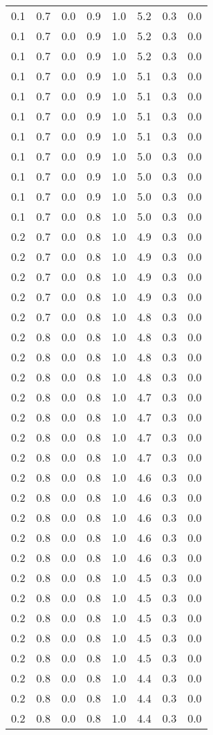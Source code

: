 \begin{tabular}{L{1in}|L{1in}|L{1in}|L{1in}|L{1in}|L{1in}|L{1in}|L{1in}}
0.1&0.7&0.0&0.9&1.0&5.2&0.3&0.0\\
0.1&0.7&0.0&0.9&1.0&5.2&0.3&0.0\\
0.1&0.7&0.0&0.9&1.0&5.2&0.3&0.0\\
0.1&0.7&0.0&0.9&1.0&5.1&0.3&0.0\\
0.1&0.7&0.0&0.9&1.0&5.1&0.3&0.0\\
0.1&0.7&0.0&0.9&1.0&5.1&0.3&0.0\\
0.1&0.7&0.0&0.9&1.0&5.1&0.3&0.0\\
0.1&0.7&0.0&0.9&1.0&5.0&0.3&0.0\\
0.1&0.7&0.0&0.9&1.0&5.0&0.3&0.0\\
0.1&0.7&0.0&0.9&1.0&5.0&0.3&0.0\\
0.1&0.7&0.0&0.8&1.0&5.0&0.3&0.0\\
0.2&0.7&0.0&0.8&1.0&4.9&0.3&0.0\\
0.2&0.7&0.0&0.8&1.0&4.9&0.3&0.0\\
0.2&0.7&0.0&0.8&1.0&4.9&0.3&0.0\\
0.2&0.7&0.0&0.8&1.0&4.9&0.3&0.0\\
0.2&0.7&0.0&0.8&1.0&4.8&0.3&0.0\\
0.2&0.8&0.0&0.8&1.0&4.8&0.3&0.0\\
0.2&0.8&0.0&0.8&1.0&4.8&0.3&0.0\\
0.2&0.8&0.0&0.8&1.0&4.8&0.3&0.0\\
0.2&0.8&0.0&0.8&1.0&4.7&0.3&0.0\\
0.2&0.8&0.0&0.8&1.0&4.7&0.3&0.0\\
0.2&0.8&0.0&0.8&1.0&4.7&0.3&0.0\\
0.2&0.8&0.0&0.8&1.0&4.7&0.3&0.0\\
0.2&0.8&0.0&0.8&1.0&4.6&0.3&0.0\\
0.2&0.8&0.0&0.8&1.0&4.6&0.3&0.0\\
0.2&0.8&0.0&0.8&1.0&4.6&0.3&0.0\\
0.2&0.8&0.0&0.8&1.0&4.6&0.3&0.0\\
0.2&0.8&0.0&0.8&1.0&4.6&0.3&0.0\\
0.2&0.8&0.0&0.8&1.0&4.5&0.3&0.0\\
0.2&0.8&0.0&0.8&1.0&4.5&0.3&0.0\\
0.2&0.8&0.0&0.8&1.0&4.5&0.3&0.0\\
0.2&0.8&0.0&0.8&1.0&4.5&0.3&0.0\\
0.2&0.8&0.0&0.8&1.0&4.5&0.3&0.0\\
0.2&0.8&0.0&0.8&1.0&4.4&0.3&0.0\\
0.2&0.8&0.0&0.8&1.0&4.4&0.3&0.0\\
0.2&0.8&0.0&0.8&1.0&4.4&0.3&0.0\\

\end{tabular}
